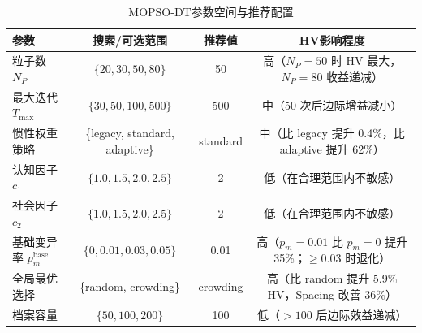 \begin{table}[h]
\centering
\caption{MOPSO-DT参数空间与推荐配置}
\label{tab:param_space}
\begin{tabular}{lccc}
\toprule
参数 & 搜索/可选范围 & 推荐值 & HV影响程度 \\
\midrule
粒子数 $N_P$ & $\{20, 30, 50, 80\}$ & 50 & 高（$N_P{=}50$ 时 HV 最大，$N_P{=}80$ 收益递减） \\
最大迭代 $T_{\max}$ & $\{30, 50, 100, 500\}$ & 500 & 中（50 次后边际增益减小） \\
惯性权重策略 & \{legacy, standard, adaptive\} & standard & 中（比 legacy 提升 0.4\%，比 adaptive 提升 62\%） \\
认知因子 $c_1$ & $\{1.0, 1.5, 2.0, 2.5\}$ & 2 & 低（在合理范围内不敏感） \\
社会因子 $c_2$ & $\{1.0, 1.5, 2.0, 2.5\}$ & 2 & 低（在合理范围内不敏感） \\
基础变异率 $p_m^{\mathrm{base}}$ & $\{0, 0.01, 0.03, 0.05\}$ & 0.01 & 高（$p_m{=}0.01$ 比 $p_m{=}0$ 提升 35\%；$\ge 0.03$ 时退化） \\
全局最优选择 & \{random, crowding\} & crowding & 高（比 random 提升 5.9\% HV，Spacing 改善 36\%） \\
档案容量 & $\{50, 100, 200\}$ & 100 & 低（${>}100$ 后边际效益递减） \\
\bottomrule
\end{tabular}
\end{table}
